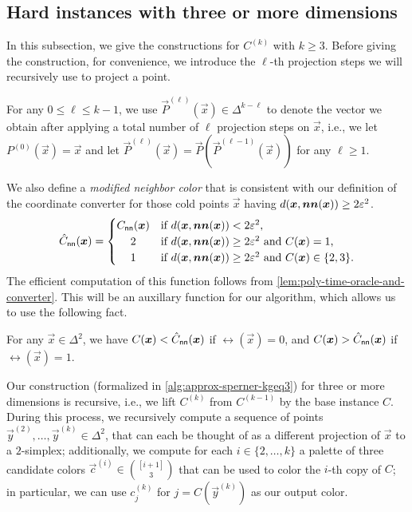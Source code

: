 \subsection{Hard instances with three or more dimensions}
\label{subsec:warmup-kd}
In this subsection, we give the constructions for $C^{(k)}$ with $k\geq 3$.
Before giving the construction, for convenience, we introduce the $\ell$-th projection steps we will recursively use to project a point.

\begin{definition}
    \label{def:lth-projection}
    For any $0\leq \ell\leq k-1$, we use $\vec{P}^{(\ell)}(\vec{x})\in \Delta^{k-\ell}$ to denote the vector we obtain after applying a total number of $\ell$ projection steps on $\vec{x}$, i.e., we let $P^{(0)}(\vec{x})=\vec{x}$ and let $\vec{P}^{(\ell)}(\vec{x}) = \vec{P}(\vec{P}^{(\ell-1)}(\vec{x}))$ for any $ \ell\geq 1$.
\end{definition}

We also define a {\em modified neighbor color} that is consistent with our definition of the coordinate converter for those cold points $\vec{x}$ having $d(\vec{x}, \vec{nn}(\vec{x}))\geq 2\eps^2$.
\begin{align}
    \label{eqn:modified-neighboring-color}
    \hat{C}_{\sf nn}(\vec{x}) = \begin{cases}
        C_{\sf nn}(\vec{x}) & \text{if $d(\vec{x}, \vec{nn}(\vec{x}))< 2\eps^2$,}\\
        \hfill 2 \hfill & \text{if $d(\vec{x}, \vec{nn}(\vec{x})) \geq 2\eps^2$ and $C(\vec{x})=1$,}\\
        \hfill 1 \hfill & \text{if $d(\vec{x}, \vec{nn}(\vec{x})) \geq 2\eps^2$ and $C(\vec{x})\in \{2,3\}$.}
    \end{cases}
\end{align}
The efficient computation of this function follows from \cref{lem:poly-time-oracle-and-converter}.
This will be an auxillary function for our algorithm, which allows us to use the following fact.
\begin{fact}
\label{fact:modified-neighboring-color}
    For any $\vec{x}\in \Delta^2$, we have $C(\vec{x})<\hat{C}_{\sf nn}(\vec{x})$ if $\rel(\vec{x})=0$, and $C(\vec{x})>\hat{C}_{\sf nn}(\vec{x})$ if $\rel(\vec{x})=1$.
\end{fact}

Our construction (formalized in \cref{alg:approx-sperner-kgeq3}) for three or more dimensions is recursive, i.e., we lift $C^{(k)}$ from $C^{(k-1)}$ by the base instance $C$. 
During this process, we recursively compute a sequence of points $\vec{y}^{(2)}, \dots, \vec{y}^{(k)}\in \Delta^2$,  that can each be thought of as a different projection of $\vec{x}$ to a $2$-simplex; additionally, we compute for each $i\in \{2,\dots,k\}$ a palette of three candidate colors $\vec{c}^{(i)}\in \binom{[i+1]}{3}$ that can be used to color the $i$-th copy of $C$; 
in particular, we can use $c^{(k)}_j$ for $j=C(\vec{y}^{(k)})$ as our output color.

